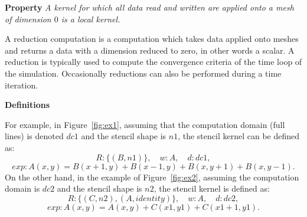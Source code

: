 \noindent \textbf{Property}
\textit{A kernel for which all data read and written are applied onto a mesh of dimension $0$ is a local kernel.}

A reduction computation is a computation which takes data applied onto meshes and returns a data with a dimension reduced to zero, in other words a scalar. A reduction is typically used to compute the convergence criteria of the time loop of the simulation. Occasionally reductions can also be performed during a time iteration. %

\medskip
\noindent \textbf{Definitions}


For example, in Figure~\ref{fig:ex1}, assuming that the computation domain (full lines) is denoted $dc1$ and the stencil shape is $n1$, the stencil kernel can be defined as:
\begin{equation*}
R: \{(B,n1)\}, \quad w: A, \quad d: dc1,
\end{equation*}
\begin{equation*}
exp: A(x,y)=B(x+1,y)+B(x-1,y)+B(x,y+1)+B(x,y-1).
\end{equation*}
On the other hand, in the example of Figure~\ref{fig:ex2}, assuming the computation domain is $dc2$ and the stencil shape is $n2$, the stencil kernel is defined as:
\begin{equation*}
R: \{(C,n2),(A,identity)\}, \quad w: A, \quad d: dc2,
\end{equation*}
\begin{equation*}
exp: A(x,y)=A(x,y)+C(x1,y1)+C(x1+1,y1).
\end{equation*}

